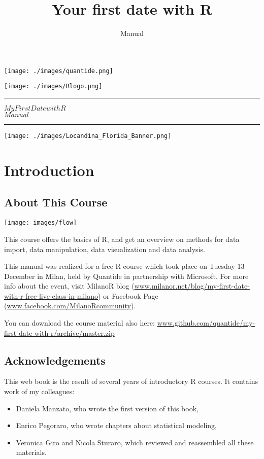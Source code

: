 \documentclass[]{book}
\title{Your first date with R}
\subtitle{Manual}
\author{}
\date{}
\providecommand{\tightlist}{%
  \setlength{\itemsep}{0pt}\setlength{\parskip}{0pt}}
\def\tightlist{}
\def\maketitle{%
  \null
  \thispagestyle{empty}%
  \hspace{-2cm}
   \begin{flushleft}\texttt{[image: ./images/quantide.png]}\end{flushleft}
  \vspace{-2cm}
  \begin{flushright}\texttt{[image: ./images/Rlogo.png]}\end{flushright}
  \vskip 3cm
  \hrule height 2pt
  \begin{center} \par \huge \strut \textbf{$My  First  Date  with  R$}\\ $Manual$ \par  \end{center}
  \vspace{0.5cm}
  \hrule height 2pt
  \vspace{0.5cm}
  \vspace{2cm}
  \texttt{[image: ./images/Locandina\_Florida\_Banner.png]}
  \clearpage
}
\begin{document}
\maketitle

{
\setcounter{tocdepth}{1}
\tableofcontents
}
\chapter{Introduction}\label{introduction}

\section{About This Course}\label{about-this-course}

\texttt{[image: images/flow]}

This course offers the basics of R, and get an overview on methods for
data import, data manipulation, data visualization and data analysis.

This manual was realized for a free R course which took place on Tuesday
13 December in Milan, held by Quantide in partnership with Microsoft.
For more info about the event, visit MilanoR blog
(\href{http://www.milanor.net/blog/my-first-date-with-r-free-live-class-in-milano/}{www.milanor.net/blog/my-first-date-with-r-free-live-class-in-milano})
or Facebook Page
(\href{https://www.facebook.com/MilanoRcommunity/?ref=aymt_homepage_panel}{www.facebook.com/MilanoRcommunity}).

You can download the course material also here:
\href{http://www.github.com/quantide/my-first-date-with-r/archive/master.zip}{www.github.com/quantide/my-first-date-with-r/archive/master.zip}

\section{Acknowledgements}\label{acknowledgements}

This web book is the result of several years of introductory R courses.
It contains work of my colleagues:

\begin{itemize}
\tightlist
\item
  Daniela Manzato, who wrote the first version of this book,
\item
  Enrico Pegoraro, who wrote chapters about statistical modeling,
\item
  Veronica Giro and Nicola Sturaro, which reviewed and reassembled all
  these materials.
\end{itemize}
\end{document}
